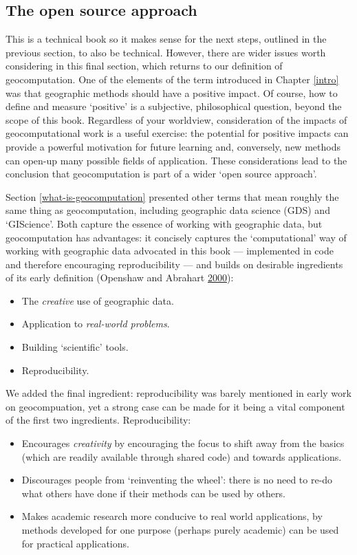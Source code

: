 \documentclass[]{krantz}
\providecommand{\tightlist}{%
  \setlength{\itemsep}{0pt}\setlength{\parskip}{0pt}}
\begin{document}
\hypertarget{benefit}{%
\subsection{The open source approach}\label{benefit}}

This is a technical book so it makes sense for the next steps, outlined in the previous section, to also be technical.
However, there are wider issues worth considering in this final section, which returns to our definition of geocomputation.
One of the elements of the term introduced in Chapter \ref{intro} was that geographic methods should have a positive impact.
Of course, how to define and measure `positive' is a subjective, philosophical question, beyond the scope of this book.
Regardless of your worldview, consideration of the impacts of geocomputational work is a useful exercise:
the potential for positive impacts can provide a powerful motivation for future learning and, conversely, new methods can open-up many possible fields of application.
These considerations lead to the conclusion that geocomputation is part of a wider `open source approach'.

Section \ref{what-is-geocomputation} presented other terms that mean roughly the same thing as geocomputation, including geographic data science (GDS) and `GIScience'.
Both capture the essence of working with geographic data, but geocomputation has advantages: it concisely captures the `computational' way of working with geographic data advocated in this book --- implemented in code and therefore encouraging reproducibility --- and builds on desirable ingredients of its early definition (Openshaw and Abrahart \protect\hyperlink{ref-openshaw_geocomputation_2000}{2000}):

\begin{itemize}
\tightlist
\item
  The \emph{creative} use of geographic data.
\item
  Application to \emph{real-world problems}.
\item
  Building `scientific' tools.
\item
  Reproducibility.
\end{itemize}

We added the final ingredient: reproducibility was barely mentioned in early work on geocompuation, yet a strong case can be made for it being a vital component of the first two ingredients.
Reproducibility:

\begin{itemize}
\tightlist
\item
  Encourages \emph{creativity} by encouraging the focus to shift away from the basics (which are readily available through shared code) and towards applications.
\item
  Discourages people from `reinventing the wheel': there is no need to re-do what others have done if their methods can be used by others.
\item
  Makes academic research more conducive to real world applications, by methods developed for one purpose (perhaps purely academic) can be used for practical applications.
\end{itemize}
\end{document}
